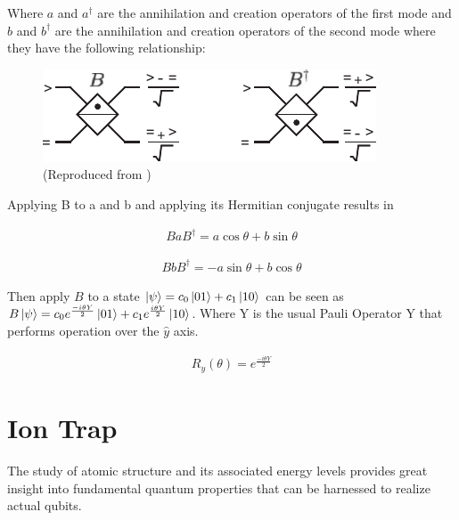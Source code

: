 \documentclass[
  journal=largetwo,
  year=2023,
]{cup-journal}
\begin{document}
Where \(a\) and \(a^{\dag}\) are the annihilation and creation operators of the first mode and \(b\) and \(b^{\dag}\) are the annihilation and creation operators of the second mode where they have the following relationship:

\begin{figure}[t]
  \centering
  \includegraphics[width=0.75\linewidth]{figs/beamsplitter.pdf}
  \caption{(Reproduced from \autocite[289]{nielsen_2010_quantum})}
  \label{fig:beamsplitter}
\end{figure}

Applying B to a and b and applying its Hermitian conjugate results in

\begin{equation}
  \begin{aligned}\label{eq:15}
    BaB^{\dag} = a\cos\theta + b\sin\theta
  \end{aligned}
\end{equation}

\begin{equation}
  \begin{aligned}\label{eq:15}
    BbB^{\dag} = -a\sin\theta + b\cos\theta
  \end{aligned}
\end{equation}


Then apply \(B\) to a state \(\ket{\psi} = c_0\ket{01} + c_1\ket{10}\) can be seen as \(B\ket{\psi} = c_0e^{\frac{-i\theta Y}{2}}\ket{01} + c_1e^{\frac{i\theta Y}{2}}\ket{10}\). Where Y is the usual Pauli Operator Y that performs operation over the \(\hat{y}\) axis.

\begin{equation}
  \begin{aligned}\label{eq:15}
    R_y(\theta) = e^{\frac{-i\theta Y}{2}}
  \end{aligned}
\end{equation}



\section{Ion Trap}
\label{cap:ion}
The study of atomic structure and its associated energy levels provides great insight into fundamental quantum properties that can be harnessed to realize actual qubits.
\end{document}

